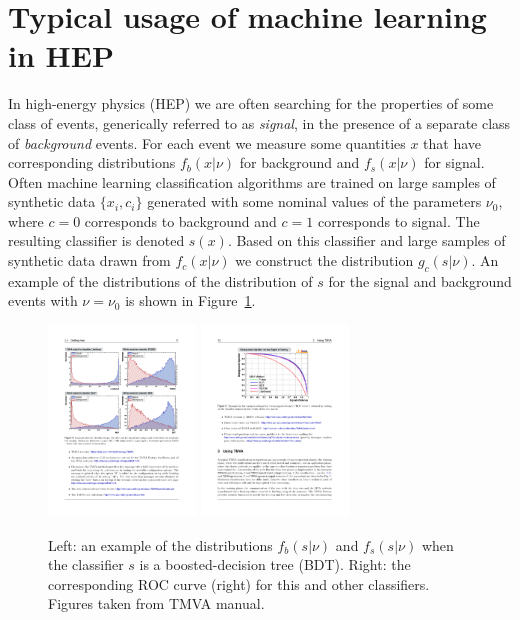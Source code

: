 \documentclass[11pt, oneside]{article}   	%
\begin{document}
\section{Typical usage of machine learning in HEP}

In high-energy physics (HEP) we are often searching for the properties of some 
class of events, generically referred to as \textit{signal}, in the presence of a separate class 
of \textit{background} events. For each event we measure some quantities $x$ that have corresponding distributions 
$f_b(x|\nu)$ for background and $f_s(x|\nu)$ for signal.  Often machine learning classification algorithms are trained on large samples of synthetic data $\{x_i, c_i\}$ generated with some nominal values of the parameters $\nu_0$, where $c=0$ corresponds to background and $c=1$ corresponds to signal. The resulting classifier is denoted $s(x)$. Based on this classifier and large samples of synthetic data drawn from $f_c(x | \nu)$ we construct the distribution  $g_c(s | \nu)$. An example of the distributions of the distribution of $s$ for the signal and background events with $\nu=\nu_0$ is shown in Figure~\ref{fig:tmva}.


\begin{figure}[htbp]
\begin{center}
 \includegraphics[height=2in]{example-TMVA-BDT.pdf}
 \includegraphics[height=2in]{example-TMVA-ROC.pdf}
\caption{Left: an example of the distributions $f_b(s|\nu)$ and $f_s(s|\nu)$ when the classifier $s$ is a boosted-decision tree (BDT). Right: the corresponding ROC curve (right) for this and other classifiers. Figures taken from TMVA manual.}
\label{fig:tmva}
\end{center}
\end{figure}
\end{document}
